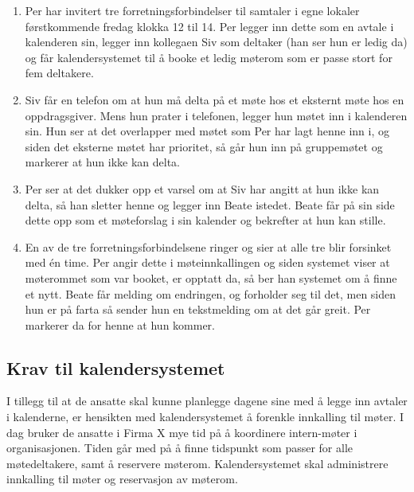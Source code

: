 \begin{enumerate}

\item
Per har invitert tre forretningsforbindelser til samtaler i egne lokaler førstkommende fredag klokka 12 til 14. Per legger inn dette som en avtale i kalenderen sin, legger inn kollegaen Siv som deltaker (han ser hun er ledig da) og får kalendersystemet til å booke et ledig møterom som er passe stort for fem deltakere.

\item
Siv får en telefon om at hun må delta på et møte hos et eksternt møte hos en oppdragsgiver. Mens hun prater i telefonen, legger hun møtet inn i kalenderen sin. Hun ser at det overlapper med møtet som Per har lagt henne inn i, og siden det eksterne møtet har prioritet, så går hun inn på gruppemøtet og markerer at hun ikke kan delta.

\item
Per ser at det dukker opp et varsel om at Siv har angitt at hun ikke kan delta, så han sletter henne og legger inn Beate istedet. Beate får på sin side dette opp som et møteforslag i sin kalender og bekrefter at hun kan stille.

\item
En av de tre forretningsforbindelsene ringer og sier at alle tre blir forsinket med én time. Per angir dette i møteinnkallingen og siden systemet viser at møterommet som var booket, er opptatt da, så ber han systemet om å finne et nytt. Beate får melding om endringen, og forholder seg til det, men siden hun er på farta så sender hun en tekstmelding om at det går greit. Per markerer da for henne at hun kommer.

\end{enumerate}

\subsection{Krav til kalendersystemet}

I tillegg til at de ansatte skal kunne planlegge dagene sine med å legge inn avtaler i kalenderne, er hensikten med kalendersystemet å forenkle innkalling til møter. I dag bruker de ansatte i Firma X mye tid på å koordinere intern-møter i organisasjonen. Tiden går med på å finne tidspunkt som passer for alle møtedeltakere, samt å reservere møterom. Kalendersystemet skal administrere innkalling til møter og reservasjon av møterom.

